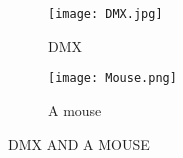 \documentclass{article}
\begin{document}
	\begin{figure}[h!]
		\centering
		\begin{subfigure}[b]{0.4\linewidth}
			
		\texttt{[image: DMX.jpg]}
			\caption{DMX}
		\end{subfigure}
		\begin{subfigure}[b]{0.4\linewidth}
		\texttt{[image: Mouse.png]}
		\caption{A mouse}
		\end{subfigure}
	\caption{DMX AND A MOUSE}
	\label{fig:2}
	\end{figure}
\end{document}
